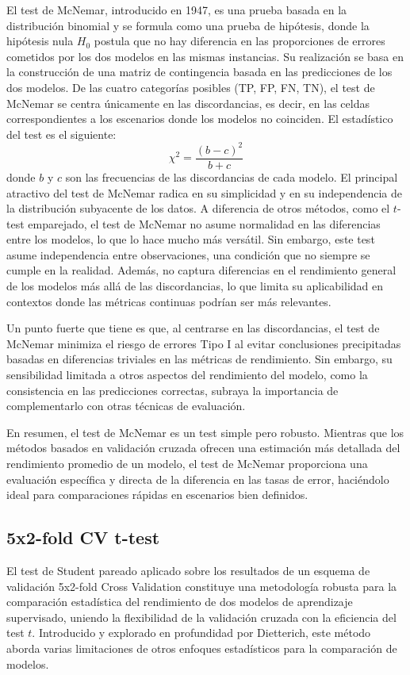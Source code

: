 \documentclass[a4paper,12pt]{article}
\begin{document}
El test de McNemar, introducido en 1947, es una prueba basada en la distribución binomial y se formula como una prueba de hipótesis, donde la hipótesis nula $H_0$ postula que no hay diferencia en las proporciones de errores cometidos por los dos modelos en las mismas instancias\cite{mcnemar1947note}. Su realización se basa en la construcción de una matriz de contingencia basada en las predicciones de los dos modelos. De las cuatro categorías posibles (TP, FP, FN, TN), el test de McNemar se centra únicamente en las discordancias, es decir, en las celdas correspondientes a los escenarios donde los modelos no coinciden. El estadístico del test es el siguiente:
$$\chi^2 = \frac{(b-c)^2}{b+c}$$
donde $b$ y $c$ son las frecuencias de las discordancias de cada modelo. El principal atractivo del test de McNemar radica en su simplicidad y en su independencia de la distribución subyacente de los datos. A diferencia de otros métodos, como el $t$-test emparejado, el test de McNemar no asume normalidad en las diferencias entre los modelos, lo que lo hace mucho más versátil. Sin embargo, este test asume independencia entre observaciones, una condición que no siempre se cumple en la realidad. Además, no captura diferencias en el rendimiento general de los modelos más allá de las discordancias, lo que limita su aplicabilidad en contextos donde las métricas continuas podrían ser más relevantes.

Un punto fuerte que tiene es que, al centrarse en las discordancias, el test de McNemar minimiza el riesgo de errores Tipo I al evitar conclusiones precipitadas basadas en diferencias triviales en las métricas de rendimiento. Sin embargo, su sensibilidad limitada a otros aspectos del rendimiento del modelo, como la consistencia en las predicciones correctas, subraya la importancia de complementarlo con otras técnicas de evaluación.

En resumen, el test de McNemar es un test simple pero robusto. Mientras que los métodos basados en validación cruzada ofrecen una estimación más detallada del rendimiento promedio de un modelo, el test de McNemar proporciona una evaluación específica y directa de la diferencia en las tasas de error, haciéndolo ideal para comparaciones rápidas en escenarios bien definidos.

\subsection{5x2-fold CV t-test}

El test de Student pareado aplicado sobre los resultados de un esquema de validación 5x2-fold Cross Validation constituye una metodología robusta para la comparación estadística del rendimiento de dos modelos de aprendizaje supervisado, uniendo la flexibilidad de la validación cruzada con la eficiencia del test $t$. Introducido y explorado en profundidad por Dietterich, este método aborda varias limitaciones de otros enfoques estadísticos para la comparación de modelos.
\end{document}
